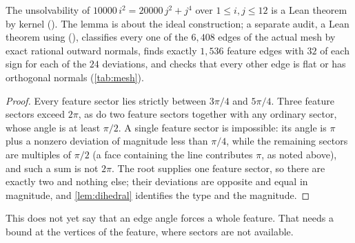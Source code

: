 The unsolvability of $10000\,i^2=20000\,j^2+j^4$ over $1\le i,j\le12$ is a Lean theorem by kernel
 (). The lemma is about the ideal construction; a separate
audit, a Lean theorem using  (), classifies every
one of the $6{,}408$ edges of the actual mesh by exact rational outward normals, finds exactly
$1{,}536$ feature edges with $32$ of each sign for each of the $24$ deviations, and checks that
every other edge is flat or has orthogonal normals (\cref{tab:mesh}).


\begin{proof}
Every feature sector lies strictly between $3\pi/4$ and $5\pi/4$. Three feature sectors exceed
$2\pi$, as do two feature sectors together with any ordinary sector, whose angle is at least
$\pi/2$. A single feature sector is impossible: its angle is $\pi$ plus a nonzero deviation of
magnitude less than $\pi/4$, while the remaining sectors are multiples of $\pi/2$ (a face
containing the line contributes $\pi$, as noted above), and such a sum is not $2\pi$. The root
supplies one feature sector, so there are exactly two and nothing else; their deviations are
opposite and equal in magnitude, and \cref{lem:dihedral} identifies the type and the magnitude.
\end{proof}

This does not yet say that an edge angle forces a whole feature. That needs a bound at the
vertices of the feature, where sectors are not available.


